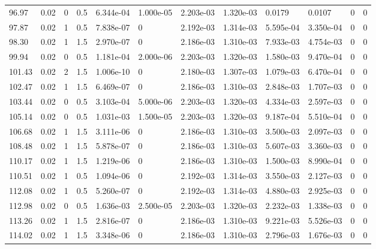 \documentclass[preview]{standalone}
\begin{document}
{{{\begin{tabular}{L{1.2cm}C{1.2cm} C{0.3cm}C{0.5cm} C{1.4cm}C{1.4cm} C{1.4cm}C{1.4cm} C{1.6cm}C{1.6cm} C{1.6cm}C{1.6cm}}
  96.97  &  0.02  & 0     & 0.5 &  6.344e-04  & 1.000e-05  &  2.203e-03&   1.320e-03& 0.0179 & 0.0107   &  0 & 0  \\ 
  97.87  &  0.02  & 1     & 0.5 &  7.838e-07  & 0  &  2.192e-03&   1.314e-03& 5.595e-04 & 3.350e-04   &  0 & 0  \\ 
  98.30  &  0.02  & 1     & 1.5 &  2.970e-07  & 0  &  2.186e-03&   1.310e-03& 7.933e-03 & 4.754e-03   &  0 & 0  \\ 
  99.94  &  0.02  & 0     & 0.5 &  1.181e-04  & 2.000e-06  &  2.203e-03&   1.320e-03& 1.580e-03 & 9.470e-04   &  0 & 0  \\ 
  101.43  &  0.02  & 2     & 1.5 &  1.006e-10  & 0  &  2.180e-03&   1.307e-03& 1.079e-03 & 6.470e-04   &  0 & 0  \\ 
  102.47  &  0.02  & 1     & 1.5 &  6.469e-07  & 0  &  2.186e-03&   1.310e-03& 2.848e-03 & 1.707e-03   &  0 & 0  \\ 
  103.44  &  0.02  & 0     & 0.5 &  3.103e-04  & 5.000e-06  &  2.203e-03&   1.320e-03& 4.334e-03 & 2.597e-03   &  0 & 0  \\ 
  105.14  &  0.02  & 0     & 0.5 &  1.031e-03  & 1.500e-05  &  2.203e-03&   1.320e-03& 9.187e-04 & 5.510e-04   &  0 & 0  \\ 
  106.68  &  0.02  & 1     & 1.5 &  3.111e-06  & 0  &  2.186e-03&   1.310e-03& 3.500e-03 & 2.097e-03   &  0 & 0  \\ 
  108.48  &  0.02  & 1     & 1.5 &  5.878e-07  & 0  &  2.186e-03&   1.310e-03& 5.607e-03 & 3.360e-03   &  0 & 0  \\ 
  110.17  &  0.02  & 1     & 1.5 &  1.219e-06  & 0  &  2.186e-03&   1.310e-03& 1.500e-03 & 8.990e-04   &  0 & 0  \\ 
  110.51  &  0.02  & 1     & 0.5 &  1.094e-06  & 0  &  2.192e-03&   1.314e-03& 3.550e-03 & 2.127e-03   &  0 & 0  \\ 
  112.08  &  0.02  & 1     & 0.5 &  5.260e-07  & 0  &  2.192e-03&   1.314e-03& 4.880e-03 & 2.925e-03   &  0 & 0  \\ 
  112.98  &  0.02  & 0     & 0.5 &  1.636e-03  & 2.500e-05  &  2.203e-03&   1.320e-03& 2.232e-03 & 1.338e-03   &  0 & 0  \\ 
  113.26  &  0.02  & 1     & 1.5 &  2.816e-07  & 0  &  2.186e-03&   1.310e-03& 9.221e-03 & 5.526e-03   &  0 & 0  \\ 
  114.02  &  0.02  & 1     & 1.5 &  3.348e-06  & 0  &  2.186e-03&   1.310e-03& 2.796e-03 & 1.676e-03   &  0 & 0  \\ 
\hline 
\end{tabular} 

}}}
\end{document}
